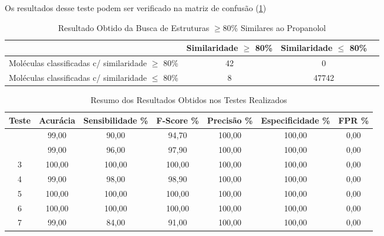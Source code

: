Os resultados desse teste podem ser verificado na matriz de confusão (\ref{tab:Propanolol})
\begin{table}[!htb]
	\centering
	\footnotesize
	\caption[Resultado Obtido da Busca de Estruturas $\geq$80\% Similares ao Propanolol]{Resultado Obtido da Busca de Estruturas $\geq$80\% Similares ao Propanolol}
	\label{tab:Propanolol}	
	\begin{tabular}{p{4cm}ccc}
		\hline \SPACE
		\textbf{}&\textbf{Similaridade $\geq $ 80\%} & \textbf{Similaridade $\leq $ 80\%} \\ \hline \SPACE
	Moléculas classificadas c/ similaridade $\geq $ 80\%  &	42 & 0 \\ \hline \SPACE
	Moléculas classificadas c/ similaridade $\leq $ 80\%  & 8 & 47742\\ \hline 
	\end{tabular}
\end{table}

\begin{table}[!htb]
	\centering
	\footnotesize
	\caption[Resumo dos Resultados Obtidos nos Testes Realizados]{Resumo dos Resultados Obtidos nos Testes Realizados}
	\label{tab:ResumoResultados}	
	\begin{tabular}{|c|c|c|c|c|c|c|}
		\hline \SPACE
		\textbf{Teste}&\textbf{Acurácia}&\textbf{Sensibilidade \%}&\textbf{F-Score \%}&\textbf{Precisão \%}&\textbf{Especificidade \%}&\textbf{FPR \%} \\ \hline \SPACE
	1\textordmasculine &99,00&90,00&94,70&100,00&100,00&0,00 \\ \hline \SPACE
	2\textordmasculine &99,00&96,00&97,90&100,00&100,00&0,00\\ \hline 
	3\textordmasculine &100,00&100,00&100,00&100,00&100,00&0,00\\ \hline
	4\textordmasculine &99,00&98,00&98,90&100,00&100,00&0,00\\ \hline
	5\textordmasculine &100,00&100,00&100,00&100,00&100,00&0,00\\ \hline
	6\textordmasculine &100,00&100,00&100,00&100,00&100,00&0,00\\ \hline
	7\textordmasculine &99,00&84,00&91,00&100,00&100,00&0,00\\ \hline
	\end{tabular}
\end{table}
 
